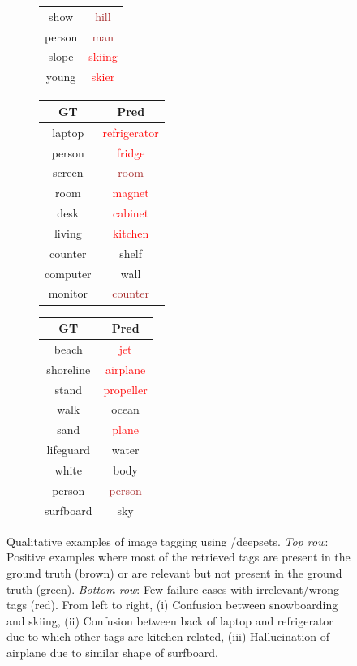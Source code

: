 \documentclass{article}
\newcommand{\extra}[1]{\textcolor{OliveGreen}{#1}}
\newcommand{\wrong}[1]{\textcolor{red}{#1}}
\newcommand{\correct}[1]{\textcolor{brown}{#1}}
\begin{document}
\begin{figure}[ht]
\begin{subfigure}[b]{0.3\textwidth}
\begin{tabular}[b]{cc}
      show & \correct{hill}\\
      person & \correct{man}\\
      slope & \wrong{skiing}\\
      young & \wrong{skier}\\
    \end{tabular}
    \end{subfigure}
    \begin{subfigure}[b]{0.3\textwidth}
    \centering
    \begin{tabular}[b]{cc}
    \textbf{GT} & \textbf{Pred} \\ \hline
      laptop &\wrong{refrigerator}\\
      person &\wrong{fridge}\\
      screen &\correct{room}\\
      room &\wrong{magnet}\\
      desk &\wrong{cabinet}\\
      living &\wrong{kitchen}\\
      counter &\extra{shelf}\\
      computer &\extra{wall}\\
      monitor &\correct{counter}\\
    \end{tabular}
    \end{subfigure}
    \begin{subfigure}[b]{0.30\textwidth}
    \centering
    \begin{tabular}[b]{cc}
    \textbf{GT} & \textbf{Pred} \\ \hline
      beach &\wrong{jet}\\
      shoreline &\wrong{airplane}\\
      stand &\wrong{propeller}\\
      walk &\extra{ocean}\\
      sand &\wrong{plane}\\
      lifeguard &\extra{water}\\
      white &\extra{body}\\
      person &\correct{person}\\
      surfboard &\extra{sky}\\
    \end{tabular}
    \end{subfigure}
    \caption{\small Qualitative examples of image tagging using /deepsets. \emph{Top row}: Positive examples where most of the retrieved tags are present in the ground truth (brown) or are relevant but not present in the ground truth (green). \emph{Bottom row}: Few failure cases with irrelevant/wrong tags (red). From left to right, (i) Confusion between snowboarding and skiing, (ii) Confusion between back of laptop and refrigerator due to which other tags are kitchen-related, (iii) Hallucination of airplane due to similar shape of surfboard.}
    \label{fig:coco-tag-examples}
\end{figure}
\end{document}

